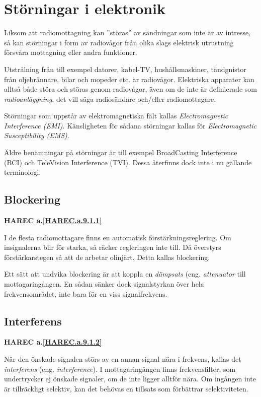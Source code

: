 \section{Störningar i elektronik}

Liksom att radiomottagning kan ''störas'' av sändningar som inte är av
intresse, så kan störningar i form av radiovågor från olika slags
elektrisk utrustning försvåra mottagning eller andra funktioner.

Utstrålning från till exempel datorer, kabel-TV, hushållsmaskiner,
tändgnistor från oljebrännare, bilar och mopeder etc. är radiovågor.
Elektriska apparater kan alltså både störa och störas genom
radiovågor, även om de inte är definierade som \emph{radioanläggning},
det vill säga radiosändare och/eller radiomottagare.

Störningar som uppstår av elektromagnetiska fält kallas
\emph{Electromagnetic Interference (EMI)}.
Känsligheten för sådana störningar kallas för
\emph{Electromagnetic Susceptibility (EMS)}.

Äldre benämningar på störningar är till exempel BroadCasting Interference (BCI) och
TeleVision Interference (TVI).
Dessa återfinns dock inte i nu gällande terminologi.

\subsection{Blockering}
\textbf{
HAREC a.\ref{HAREC.a.9.1.1}\label{myHAREC.a.9.1.1}
}

I de flesta radiomottagare finns en automatisk förstärkningsreglering.
Om insignalerna blir för starka, så räcker regleringen inte till.
Då överstyrs förstärkarstegen så att de arbetar olinjärt.
Detta kallas blockering.

Ett sätt att undvika blockering är att koppla en \emph{dämpsats}
(eng. \emph{attenuator} till mottagaringången.
En sådan sänker dock signalstyrkan över hela frekvensområdet, inte bara för en
viss signalfrekvens.

\subsection{Interferens}
\textbf{
HAREC a.\ref{HAREC.a.9.1.2}\label{myHAREC.a.9.1.2}
}

När den önskade signalen störs av en annan signal nära i frekvens, kallas det
\emph{interferens} (eng. \emph{interference}).
I mottagaringången finns frekvensfilter, som undertrycker ej önskade signaler,
om de inte ligger alltför nära.
Om ingången inte är tillräckligt selektiv, kan det behövas en tillsats som
förbättrar selektiviteten.

